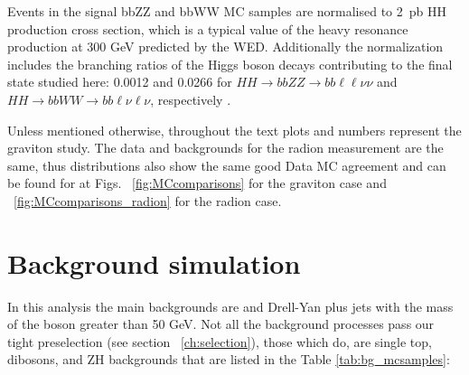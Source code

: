 Events in the signal bbZZ and bbWW MC samples are normalised to 2~pb HH production cross section, which is a typical value of the heavy resonance production at 300 GeV predicted by the WED. Additionally the normalization includes the branching ratios of the Higgs boson decays contributing to the final state studied here: 0.0012 and 0.0266 for $HH\to bbZZ\to bb\ell\ell\nu\nu$ and $HH\to bbWW\to bb\ell\nu\ell\nu$, respectively \cite{CERNYR4}.


Unless mentioned otherwise, throughout the text plots and numbers represent the graviton study. The data and backgrounds for the radion measurement are the same, thus distributions also show the same good Data MC agreement and can be found for at Figs. ~\ref{fig:MCcomparisons} for the graviton case and ~\ref{fig:MCcomparisons_radion} for the radion case.

\section{Background simulation\label{sec:bkgMC}}

In this analysis the main backgrounds are \ttbar and Drell-Yan plus
jets with the mass of the boson greater than 50 GeV. Not all the
background processes pass our tight preselection (see section ~\ref{ch:selection}),
those which do, are single top, dibosons, and ZH backgrounds that are
listed in the Table \ref{tab:bg_mcsamples}:

